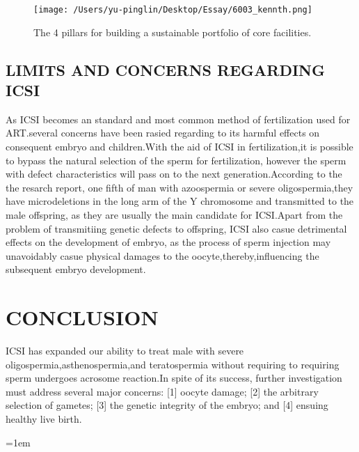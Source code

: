 \documentclass[12pt]{article}
\begin{document}
\begin{figure}[H]
    \texttt{[image: /Users/yu-pinglin/Desktop/Essay/6003\_kennth.png]}
    \centering
    \caption{The 4 pillars for building a sustainable portfolio of
    core facilities.}
\end{figure}

\subsection{LIMITS AND CONCERNS REGARDING ICSI}
As ICSI becomes an standard and most common method of fertilization used for ART.several concerns have been  rasied regarding to its harmful effects on consequent embryo and children.With the aid of ICSI in fertilization,it is possible to bypass the natural selection of the sperm for fertilization, however the sperm with defect characteristics will pass on to the next generation.According to the the resarch report, one fifth of man with azoospermia or severe oligospermia,they have microdeletions in the long arm of the Y chromosome and transmitted to the male offspring, as they are usually the main candidate for ICSI.Apart from the problem of transmitiing genetic defects to offspring, ICSI also casue detrimental effects on the development of embryo, as the process of sperm injection may unavoidably casue physical damages to the oocyte,thereby,influencing the subsequent embryo development.
\section{CONCLUSION}
ICSI has expanded our ability to treat male with severe oligospermia,asthenospermia,and teratospermia without requiring
to requiring sperm undergoes acrosome reaction.In spite of its success, further investigation must address several major
concerns: [1] oocyte damage; [2] the arbitrary selection
of gametes; [3] the genetic integrity of the embryo;
and [4] ensuing healthy live birth.

\emergencystretch=1em
\printbibliography[title=Reference]
\end{document}
